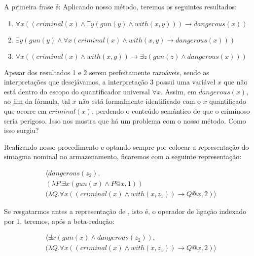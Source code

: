 A primeira frase é:  Aplicando nosso método, teremos os seguintes resultados:
\begin{enumerate}
\item $\forall x((criminal(x) \land \exists y (gun(y) \land with(x,y))) \rightarrow dangerous(x))$
\item $\exists y(gun(y) \land \forall x(criminal(x) \land with(x,y) \rightarrow dangerous(x)))$
\item $\forall x((criminal(x) \land with(x,y)) \rightarrow \exists z(gun(z) \land dangerous(x))) $
\end{enumerate}

\fixd
Apesar dos resultados 1 e 2 serem perfeitamente razoáveis, sendo as interpretações que desejávamos, a interpretação 3 possui uma variável $x$ que não está dentro do escopo do quantificador universal $\forall x$. Assim, em $dangerous(x)$, ao fim da fórmula, tal $x$ não está formalmente identificado com o $x$ quantificado que ocorre em $criminal(x)$, perdendo o conteúdo semântico de que o criminoso seria perigoso.    Isso nos mostra que há um problema com o nosso método. Como isso surgiu? 

Realizando nosso procedimento e optando sempre por colocar a representação do sintagma nominal no armazenamento, ficaremos com a seguinte representação:

\begin{align*}
	&\langle dangerous(z_2),
	\\ & (\lambda P. \exists x ( gun(x) \land P@x, 1))
	\\ & (\lambda Q. \forall x ( (criminal(x) \land with(x,z_1)) \rightarrow Q@x, 2)
	\rangle
\end{align*}

Se resgatarmos antes a representação de , isto é, o operador de ligação indexado por $1$, teremos, após a beta-redução:

\begin{align*}
	& \langle \exists x ( gun(x) \land dangerous(z_2)),
	\\ & ( \lambda Q. \forall x ( (criminal(x) \land with(x,z_1)) \rightarrow Q@x, 2 )
	\rangle
\end{align*}

